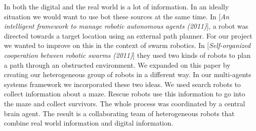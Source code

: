 In both the digital and the real world is a lot of information. In an ideally situation we would want to use bot these sources at the same time. In [\textit{An intelligent framework to manage robotic autonomous agents (2011)}], a robot was directed towards a target location using an external path planner. For our project we wanted to improve on this in the context of swarm robotics. In [\textit{Self-organized cooperation between robotic swarms (2011)}] they used two kinds of robots to plan a path through an obstructed environment.  We expanded on this paper by creating our heterogeneous group of robots in a different way.
In our multi-agents systems framework we incorporated these two ideas. We used search robots to collect information about a maze. Rescue robots use this information to go into the maze and collect survivors. The whole process was coordinated by a central brain agent.
The result is a collaborating team of heterogeneous robots that combine real world information and digital information. 
